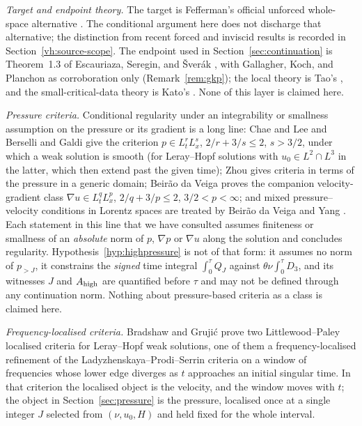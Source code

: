 \documentclass[11pt]{article}
\theoremstyle{definition}
\theoremstyle{plain}
\begin{document}
\emph{Target and endpoint theory.}  The target is Fefferman's official
unforced whole-space alternative \cite{Fefferman2000}. The conditional
argument here does not discharge that alternative; the distinction from
recent forced and inviscid results is recorded in
Section~\ref{vh:source-scope}.  The endpoint used in
Section~\ref{sec:continuation} is Theorem~1.3 of Escauriaza, Seregin, and
\v Sver\'ak \cite{ESS2003}, with Gallagher, Koch, and Planchon
\cite{GKP2013} as corroboration only (Remark~\ref{rem:gkp}); the local
theory is Tao's \cite{Tao2013}, and the small-critical-data theory is
Kato's \cite{Kato1984}.  None of this layer is claimed here.

\emph{Pressure criteria.}  Conditional regularity under an integrability or
smallness assumption on the pressure or its gradient is a long line: Chae and
Lee \cite{ChaeLee2001} and Berselli and Galdi \cite{BerselliGaldi2002} give
the criterion $p\in L^r_tL^s_x$, $2/r+3/s\le2$, $s>3/2$, under which a weak
solution is smooth (for Leray--Hopf solutions with $u_0\in L^2\cap L^3$ in
the latter, which then extend past the given time); Zhou \cite{Zhou2004}
gives criteria in terms of the pressure in a generic domain; Beir\~ao da
Veiga \cite{BeiraoDaVeiga1995} proves the companion velocity-gradient class
$\nabla u\in L^q_tL^p_x$, $2/q+3/p\le2$, $3/2<p<\infty$; and mixed
pressure--velocity conditions in Lorentz spaces are
treated by Beir\~ao da Veiga and Yang
\cite{BeiraoDaVeigaYang2021,BeiraoDaVeigaYang2022}.  Each statement in this
line that we have consulted assumes finiteness or smallness of an \emph{absolute} norm of $p$,
$\nabla p$ or $\nabla u$ along the solution and concludes regularity.
Hypothesis~\ref{hyp:highpressure} is not of that form: it assumes no norm of
$p_{>J}$, it constrains the \emph{signed} time integral $\int_0^\tau Q_J$
against $\theta\nu\int_0^\tau D_3$, and its witnesses $J$ and
$A_{\rm high}$ are quantified before $\tau$ and may not be defined through
any continuation norm.  Nothing about pressure-based criteria as a class is
claimed here.

\emph{Frequency-localised criteria.}  Bradshaw and Gruji\'c
\cite{BradshawGrujic2017} prove two Littlewood--Paley localised criteria for
Leray--Hopf weak solutions, one of them a frequency-localised refinement of
the La\-dy\-zhen\-skaya--Prodi--Serrin criteria on a window of frequencies whose
lower edge diverges as $t$ approaches an initial singular time.  In that
criterion the localised object is the velocity, and the window moves with
$t$; the object
in Section~\ref{sec:pressure} is the pressure, localised once at a single
integer $J$ selected from $(\nu,u_0,H)$ and held fixed for the whole
interval.
\end{document}
